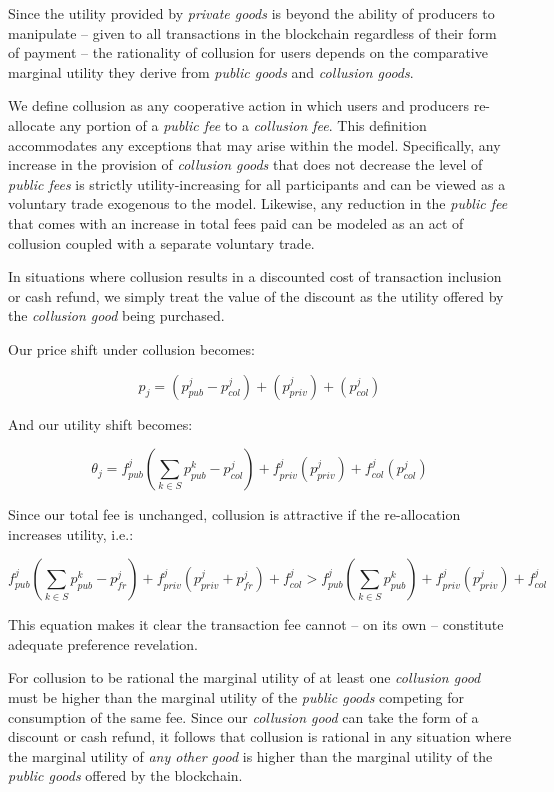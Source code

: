 \documentclass[oneside]{article}   	%
\begin{document}
Since the utility provided by \textit{private goods} is beyond the ability of producers to manipulate -- given to all transactions in the blockchain regardless of their form of payment -- the rationality of collusion for users depends on the comparative marginal utility they derive from \textit{public goods} and \textit{collusion goods}.

We define collusion as any cooperative action in which users and producers re-allocate any portion of a \textit{public fee} to a \textit{collusion fee}. This definition accommodates any exceptions that may arise within the model. Specifically, any increase in the provision of \textit{collusion goods} that does not decrease the level of \textit{public fees} is strictly utility-increasing for all participants and can be viewed as a voluntary trade exogenous to the model. Likewise, any reduction in the \textit{public fee} that comes with an increase in total fees paid can be modeled as an act of collusion coupled with a separate voluntary trade.

In situations where collusion results in a discounted cost of transaction inclusion or cash refund, we simply treat the value of the discount as the utility offered by the \textit{collusion good} being purchased.

Our price shift under collusion becomes:

$$
p_j = \left( p_{pub}^j - p_{col}^j \right) + \left( p_{priv}^j \right) + \left( p_{col}^j \right)
$$

And our utility shift becomes:

$$
\theta_j = f_{pub}^j\left(\sum_{k \in S} p_{pub}^{k} - p_{col}^j \right) + f_{priv}^j\left( p_{priv}^j \right) + f_{col}^j\left(p_{col}^j \right)
$$

Since our total fee is unchanged, collusion is attractive if the re-allocation increases utility, i.e.:

\[
f_{pub}^j\left(\sum_{k \in S} p_{pub}^{k} - p_{fr}^j \right) + f_{priv}^j( p_{priv}^j + p_{fr}^j ) + f_{col}^j
>
f_{pub}^j\left(\sum_{k \in S} p_{pub}^{k}\right) + f_{priv}^j(p_{priv}^j) + f_{col}^j
\]

This equation makes it clear the transaction fee cannot -- on its own -- constitute adequate preference revelation.

For collusion to be rational the marginal utility of at least one \textit{collusion good} must be higher than the marginal utility of the \textit{public goods} competing for consumption of the same fee. Since our \textit{collusion good} can take the form of a discount or cash refund, it follows that collusion is rational in any situation where the marginal utility of \textit{any other good} is higher than the marginal utility of the \textit{public goods} offered by the blockchain.
\end{document}
